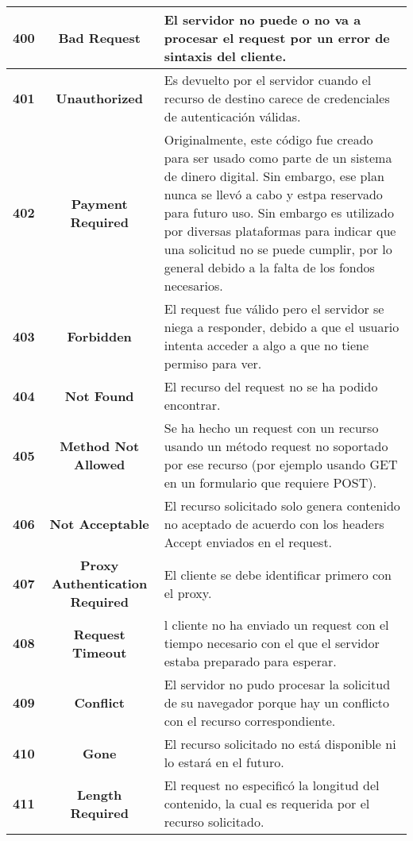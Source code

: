 \documentclass[10pt,a4paper]{article} %
\begin{document}
\begin{large}
\begin{longtable}[H]{ | c | c | p{8cm} |}
        \textbf{400} & \textbf{Bad Request} & El servidor no puede o no va a procesar el request por un error de sintaxis del cliente. \\
        \hline
        \textbf{401} & \textbf{Unauthorized} &  Es devuelto por el servidor cuando el recurso de destino carece de credenciales de autenticaci{\'o}n v{\'a}lidas. \\
        \hline
        \textbf{402} & \textbf{Payment Required} & Originalmente, este c{\'o}digo fue creado para ser usado como parte de un sistema de dinero digital. Sin embargo, ese plan nunca se llev{\'o} a cabo y estpa reservado para futuro uso. Sin embargo es utilizado por diversas plataformas para indicar que una solicitud no se puede cumplir, por lo general debido a la falta de los fondos necesarios.  \\
        \hline
        \textbf{403} & \textbf{Forbidden} & El request fue v{\'a}lido pero el servidor se niega a responder, debido a que el usuario intenta acceder a algo a que no tiene permiso para ver. \\
        \hline
        \textbf{404} & \textbf{Not Found} & El recurso del request no se ha podido encontrar. \\
        \hline
        \textbf{405} & \textbf{Method Not Allowed} &  Se ha hecho un request con un recurso usando un m{\'e}todo request no soportado por ese recurso (por ejemplo usando GET en un formulario que requiere POST). \\
        \hline
        \textbf{406} & \textbf{Not Acceptable} & El recurso solicitado solo genera contenido no aceptado de acuerdo con los headers Accept enviados en el request. \\
        \hline
        \textbf{407} & \textbf{Proxy Authentication Required} & El cliente se debe identificar primero con el proxy. \\
        \hline
        \textbf{408} & \textbf{Request Timeout} & l cliente no ha enviado un request con el tiempo necesario con el que el servidor estaba preparado para esperar. \\
        \hline
        \textbf{409} & \textbf{Conflict} & El servidor no pudo procesar la solicitud de su navegador porque hay un conflicto con el recurso correspondiente.  \\
        \hline
        \textbf{410} & \textbf{Gone} & El recurso solicitado no est{\'a} disponible ni lo estar{\'a} en el futuro. \\
        \hline
        \textbf{411} & \textbf{Length Required} & El request no especific{\'o} la longitud del contenido, la cual es requerida por el recurso solicitado. \\

\end{longtable}
\end{large}
\end{document}
